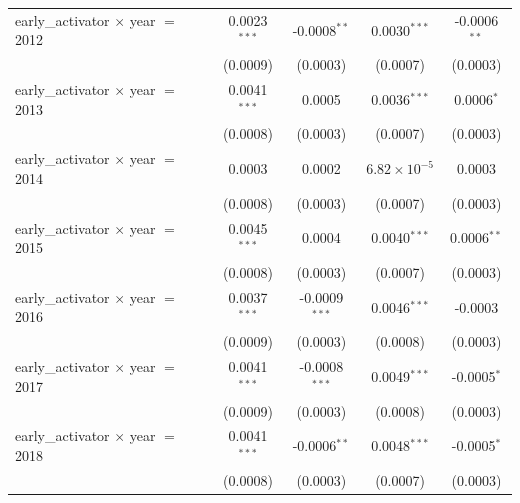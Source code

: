 \begin{tabular}{lcccc}
   early\_activator $\times$ year $=$ 2012               & 0.0023$^{***}$         & -0.0008$^{**}$            & 0.0030$^{***}$         & -0.0006$^{**}$\\   
                                                         & (0.0009)               & (0.0003)                  & (0.0007)               & (0.0003)\\   
   early\_activator $\times$ year $=$ 2013               & 0.0041$^{***}$         & 0.0005                    & 0.0036$^{***}$         & 0.0006$^{*}$\\   
                                                         & (0.0008)               & (0.0003)                  & (0.0007)               & (0.0003)\\   
   early\_activator $\times$ year $=$ 2014               & 0.0003                 & 0.0002                    & $6.82\times 10^{-5}$   & 0.0003\\   
                                                         & (0.0008)               & (0.0003)                  & (0.0007)               & (0.0003)\\   
   early\_activator $\times$ year $=$ 2015               & 0.0045$^{***}$         & 0.0004                    & 0.0040$^{***}$         & 0.0006$^{**}$\\   
                                                         & (0.0008)               & (0.0003)                  & (0.0007)               & (0.0003)\\   
   early\_activator $\times$ year $=$ 2016               & 0.0037$^{***}$         & -0.0009$^{***}$           & 0.0046$^{***}$         & -0.0003\\   
                                                         & (0.0009)               & (0.0003)                  & (0.0008)               & (0.0003)\\   
   early\_activator $\times$ year $=$ 2017               & 0.0041$^{***}$         & -0.0008$^{***}$           & 0.0049$^{***}$         & -0.0005$^{*}$\\   
                                                         & (0.0009)               & (0.0003)                  & (0.0008)               & (0.0003)\\   
   early\_activator $\times$ year $=$ 2018               & 0.0041$^{***}$         & -0.0006$^{**}$            & 0.0048$^{***}$         & -0.0005$^{*}$\\   
                                                         & (0.0008)               & (0.0003)                  & (0.0007)               & (0.0003)\\   

\end{tabular}
